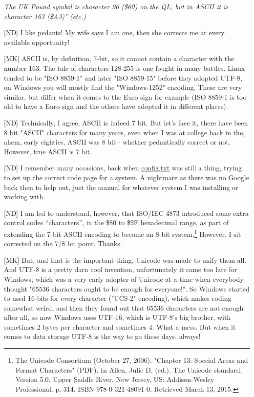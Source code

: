 \emph{The UK Pound symbol is character 96 (\$60) on the QL, but in ASCII
it is character 163 (\$A3)" (etc.)}

[ND] I like pedants! My wife says I am one, then she corrects me at every available opportunity!


[MK] ASCII is, by definition, 7-bit, so it cannot contain a character with
the number 163. The tale of characters 128-255 is one fought in many
battles. Linux tended to be "ISO 8859-1" and later "ISO 8859-15"
before they adopted UTF-8, on Windows you will mostly find the
"Windows-1252" encoding. These are very similar, but differ when it
comes to the Euro sign for example (ISO 8859-1 is too old to have a
Euro sign and the others have adopted it in different places).

[ND] Technically, I agree, ASCII is indeed 7 bit. But let's face it, there have been 8 bit "ASCII" characters for many years, even when I was at college back in the, ahem, early eighties, ASCII was 8 bit - whether pedantically correct or not. However, true ASCII is 7 bit.

[ND] I remember many occasions, back when \url{config.txt} was still a thing, trying to set up the correct code page for a system. A nightmare as there was no Google back then to help out, just the manual for whatever system I was installing or working with.

[ND] I am led to understand, however, that ISO/IEC 4873 introduced some extra control codes ``characters'', in the \$80 to \$9F hexadecimal range, as part of extending the 7-bit ASCII encoding to become an 8-bit system.\footnote{The Unicode Consortium (October 27, 2006). "Chapter 13: Special Areas and Format Characters" (PDF). In Allen, Julie D. (ed.). The Unicode standard, Version 5.0. Upper Saddle River, New Jersey, US: Addison-Wesley Professional. p. 314. ISBN 978-0-321-48091-0. Retrieved March 13, 2015.} However, I sit corrected on the 7/8 bit point. Thanks.


[MK] But, and that is the important thing, Unicode was made to unify them
all. And UTF-8 is a pretty darn cool invention, unfortunately it came
too late for Windows, which was a very early adopter of Unicode at a
time when everybody thought "65536 characters ought to be enough for
everyone!". So Windows started to used 16-bits for every character
("UCS-2" encoding), which makes coding somewhat weird, and then they
found out that 65536 characters are not enough after all, so now
Windows uses UTF-16, which is UTF-8's big brother, with sometimes 2
bytes per character and sometimes 4. What a mess. But when it comes to
data storage UTF-8 is the way to go these days, always!


